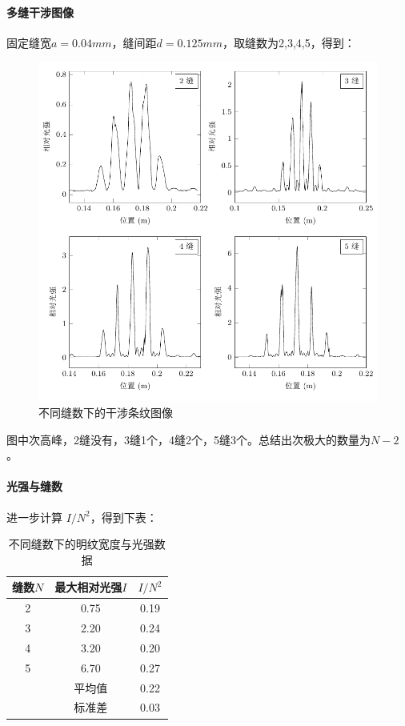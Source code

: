\documentclass[a4paper]{../phyreport}
\begin{document}
\paragraph{多缝干涉图像}
固定缝宽$a=0.04mm$，缝间距$d= 0.125mm$，取缝数为2,3,4,5，得到：
\begin{figure}[H]
  \centering
  \includegraphics[]{fig/多缝/多缝2345tikz.pdf}
    \caption{不同缝数下的干涉条纹图像} \label{缝数}
\end{figure}

图中次高峰，2缝没有，3缝1个，4缝2个，5缝3个。总结出次极大的数量为$N-2$。

\paragraph{光强与缝数} 进一步计算 $I / N^2$，得到下表：
\begin{table}[H]
  \centering
  \caption{不同缝数下的明纹宽度与光强数据}
    \begin{tabular}{ccc}
    \toprule
    缝数$N$  & 最大相对光强$I$ & $I / N^2$ \\
    \midrule
    2  & 0.75  & 0.19  \\
    3  & 2.20  & 0.24  \\
    4  & 3.20  & 0.20  \\
    5  & 6.70  & 0.27  \\
    \midrule
          & 平均值   & 0.22  \\
          & 标准差   & 0.03  \\
    \bottomrule
    \end{tabular}%
  \label{tab:不同缝数下的明纹宽度与光强数据}
\end{table}%
\end{document}
